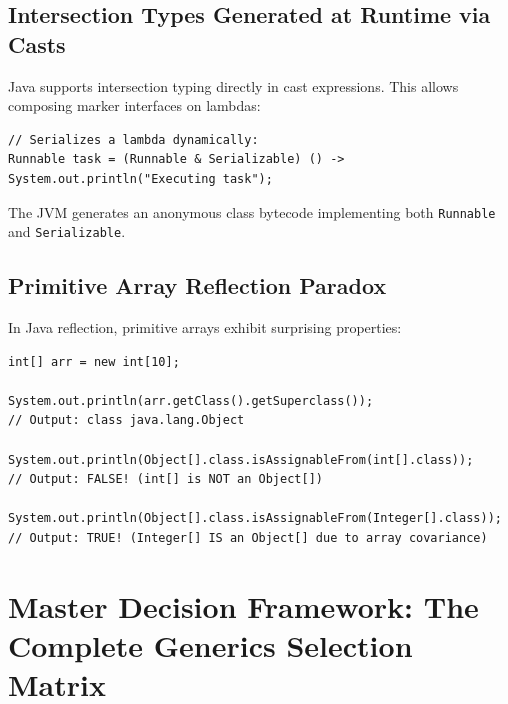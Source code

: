 \documentclass[10pt,journal,compsoc,onecolumn]{IEEEtran}
\begin{document}
\subsection{Intersection Types Generated at Runtime via Casts}
Java supports intersection typing directly in cast expressions. This allows composing marker interfaces on lambdas:
\begin{lstlisting}
// Serializes a lambda dynamically:
Runnable task = (Runnable & Serializable) () -> System.out.println("Executing task");
\end{lstlisting}
The JVM generates an anonymous class bytecode implementing both \texttt{Runnable} and \texttt{Serializable}.

\subsection{Primitive Array Reflection Paradox}
In Java reflection, primitive arrays exhibit surprising properties:
\begin{lstlisting}
int[] arr = new int[10];

System.out.println(arr.getClass().getSuperclass()); 
// Output: class java.lang.Object

System.out.println(Object[].class.isAssignableFrom(int[].class)); 
// Output: FALSE! (int[] is NOT an Object[])

System.out.println(Object[].class.isAssignableFrom(Integer[].class)); 
// Output: TRUE! (Integer[] IS an Object[] due to array covariance)
\end{lstlisting}

\section{Master Decision Framework: The Complete Generics Selection Matrix}
\label{sec:decision_framework}
\end{document}
